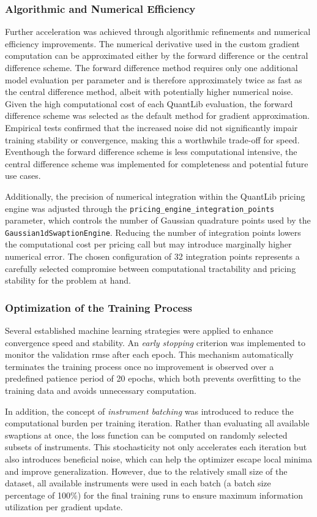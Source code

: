 \subsubsection{Algorithmic and Numerical Efficiency}
\label{appendix:algorithmic_and_numerical_efficiency}
Further acceleration was achieved through algorithmic refinements and numerical efficiency improvements. The numerical derivative used in the custom gradient computation can be approximated either by the forward difference or the central difference scheme. The forward difference method requires only one additional model evaluation per parameter and is therefore approximately twice as fast as the central difference method, albeit with potentially higher numerical noise. Given the high computational cost of each QuantLib evaluation, the forward difference scheme was selected as the default method for gradient approximation. Empirical tests confirmed that the increased noise did not significantly impair training stability or convergence, making this a worthwhile trade-off for speed. Eventhough the forward difference scheme is less computational intensive, the central difference scheme was implemented for completeness and potential future use cases.

Additionally, the precision of numerical integration within the QuantLib pricing engine was adjusted through the \texttt{pricing\_engine\_integration\_points} parameter, which controls the number of Gaussian quadrature points used by the \texttt{Gaussian1dSwaptionEngine}. Reducing the number of integration points lowers the computational cost per pricing call but may introduce marginally higher numerical error. The chosen configuration of 32 integration points represents a carefully selected compromise between computational tractability and pricing stability for the problem at hand.

\subsubsection{Optimization of the Training Process}
Several established machine learning strategies were applied to enhance convergence speed and stability. An \textit{early stopping} criterion was implemented to monitor the validation \ac{rmse} after each epoch. This mechanism automatically terminates the training process once no improvement is observed over a predefined patience period of 20 epochs, which both prevents overfitting to the training data and avoids unnecessary computation.

In addition, the concept of \textit{instrument batching} was introduced to reduce the computational burden per training iteration. Rather than evaluating all available swaptions at once, the loss function can be computed on randomly selected subsets of instruments. This stochasticity not only accelerates each iteration but also introduces beneficial noise, which can help the optimizer escape local minima and improve generalization. However, due to the relatively small size of the dataset, all available instruments were used in each batch (a batch size percentage of 100\%) for the final training runs to ensure maximum information utilization per gradient update.

